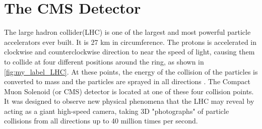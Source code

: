 \chapter{\label{CMS}The CMS Detector}

The large hadron collider(LHC) is one of the largest and most powerful particle accelerators ever built. It is 27 km in circumference. The protons is accelerated in clockwise and counterclockwise direction to near the speed of light, causing them to collide at four different positions around the ring, as shown in \autoref{fig:my_label_LHC}. At these points, the energy of the collision of the particles is converted to mass and the particles are sprayed in all directions \cite{CMS_1}. The Compact Muon Solenoid (or CMS) detector is located at one of these four collision points. It was designed to observe new physical phenomena that the LHC may reveal by acting as a giant high-speed camera, taking 3D "photographs" of particle collisions from all directions up to 40 million times per second. 



